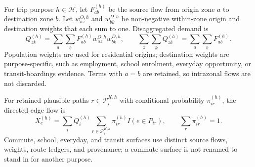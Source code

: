 For trip purpose $h\in\mathcal{H}$, let $F_{ab}^{(h)}$ be the source flow from
origin zone $a$ to destination zone $b$. Let $w_{az}^{O,h}$ and
$w_{bk}^{D,h}$ be non-negative within-zone origin and destination weights that
each sum to one. Disaggregated demand is
\begin{equation}
Q_{zk}^{(h)}
=\sum_a\sum_b F_{ab}^{(h)}w_{az}^{O,h}w_{bk}^{D,h},
\qquad
\sum_z\sum_k Q_{zk}^{(h)}=\sum_a\sum_b F_{ab}^{(h)}.
\label{eq:purpose-disaggregation}
\end{equation}
Population weights are used for residential origins; destination weights are
purpose-specific, such as employment, school enrolment, everyday opportunity,
or transit-boardings evidence. Terms with $a=b$ are retained, so intrazonal
flows are not discarded.

For retained plausible paths $r\in\mathcal{P}_{i}^{K,h}$ with conditional
probability $\pi_{ir}^{(h)}$, the directed edge flow is
\begin{equation}
X_e^{(h)}
=\sum_i Q_i^{(h)}
  \sum_{r\in\mathcal{P}_{i}^{K,h}}
  \pi_{ir}^{(h)}I(e\in P_{ir}),
\qquad
\sum_r\pi_{ir}^{(h)}=1.
\label{eq:purpose-edge-flow}
\end{equation}
Commute, school, everyday, and transit surfaces use distinct source flows,
weights, route ledgers, and provenance; a commute surface is not renamed to
stand in for another purpose.
